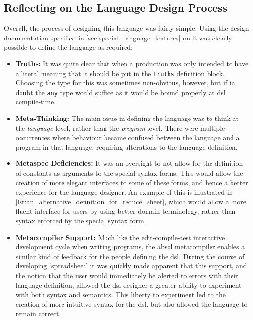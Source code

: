 \subsection{Reflecting on the Language Design Process} %
\label{sub:reflecting_on_the_language_design_process}
Overall, the process of designing this language was fairly simple.
Using the design documentation specified in \autoref{sec:special_language_features} on  it was clearly possible to define the language as required:
\begin{itemize}
    \item \textbf{Truths:} It was quite clear that when a production was only intended to have a literal meaning that it should be put in the \texttt{truths} definition block.
    Choosing the type for this was sometimes non-obvious, however, but if in doubt the \texttt{any} type would suffice as it would be bound properly at \gls{dsl} compile-time.
    \item \textbf{Meta-Thinking:} The main issue in defining the language was to think at the \textit{language} level, rather than the \textit{program} level.
    There were multiple occurrences where behaviour became confused between the language and a program in that language, requiring alterations to the language definition. 
    \item \textbf{Metaspec Deficiencies:} It was an oversight to not allow for the definition of constants as arguments to the special-syntax forms. 
    This would allow the creation of more elegant interfaces to some of these forms, and hence a better experience for the language designer.
    An example of this is illustrated in \autoref{lst:an_alternative_definition_for_reduce_sheet}, which would allow a more fluent interface for users by using better domain terminology, rather than syntax enforced by the special syntax form. 
    \item \textbf{Metacompiler Support:} Much like the edit-compile-test interactive development cycle when writing programs, the \gls{absol} metacompiler enables a similar kind of feedback for the people defining the \gls{dsl}.
    During the course of developing `spreadsheet' it was quickly made apparent that this support, and the notion that the user would immediately be alerted to errors with their language definition, allowed the \gls{dsl} designer a greater ability to experiment with both syntax and semantics.
    This liberty to experiment led to the creation of more intuitive syntax for the \gls{dsl}, but also allowed the language to remain correct.
\end{itemize}

